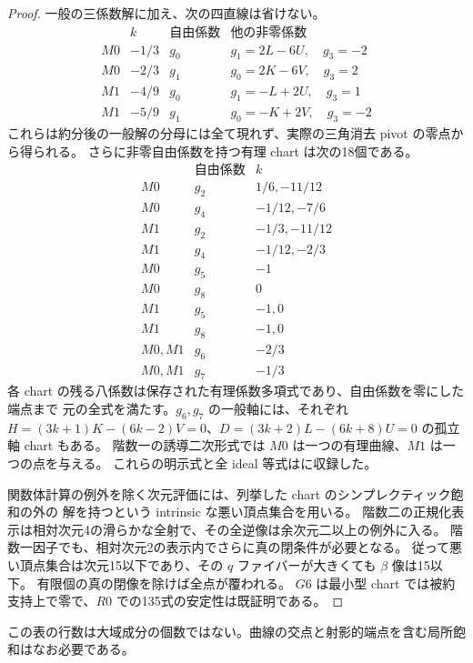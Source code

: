 \documentclass[11pt,a4paper]{ltjsarticle}
\theoremstyle{remark}
\begin{document}
\begin{proof}
一般の三係数解に加え、次の四直線は省けない。
\[
\begin{array}{c|c|c|l}
 &k&\text{自由係数}&\text{他の非零係数}\\\hline
 M0&-1/3&g_0&g_1=2L-6U,\quad g_3=-2\\
 M0&-2/3&g_1&g_0=2K-6V,\quad g_3=2\\
 M1&-4/9&g_0&g_1=-L+2U,\quad g_3=1\\
 M1&-5/9&g_1&g_0=-K+2V,\quad g_3=-2
\end{array}
\]
これらは約分後の一般解の分母には全て現れず、実際の三角消去 pivot の零点から得られる。
さらに非零自由係数を持つ有理 chart は次の18個である。
\[
\begin{array}{c|c|c}
&\text{自由係数}&k\\\hline
M0&g_2&1/6,-11/12\\ M0&g_4&-1/12,-7/6\\
M1&g_2&-1/3,-11/12\\ M1&g_4&-1/12,-2/3\\
M0&g_5&-1\\M0&g_8&0\\
M1&g_5&-1,0\\M1&g_8&-1,0\\
M0,M1&g_6&-2/3\\M0,M1&g_7&-1/3
\end{array}
\]
各 chart の残る八係数は保存された有理係数多項式であり、自由係数を零にした端点まで
元の全式を満たす。$g_6,g_7$ の一般軸には、それぞれ
$H=(3k+1)K-(6k-2)V=0$、$D=(3k+2)L-(6k+8)U=0$ の孤立軸 chart もある。
階数一の誘導二次形式では $M0$ は一つの有理曲線、$M1$ は一つの点を与える。
これらの明示式と全 ideal 等式は\cite{minimal-all-v35}に収録した。

関数体計算の例外を除く次元評価には、列挙した chart のシンプレクティック飽和の外の
解を持つという intrinsic な悪い頂点集合を用いる。
階数二の正規化表示は相対次元4の滑らかな全射で、その全逆像は余次元二以上の例外に入る。
階数一因子でも、相対次元2の表示内でさらに真の閉条件が必要となる。
従って悪い頂点集合は次元15以下であり、その $q$ ファイバーが大きくても $\beta$ 像は15以下。
有限個の真の閉像を除けば全点が覆われる。
$G6$ は最小型 chart では被約支持上で零で、$R0$ での135式の安定性は既証明である。
\end{proof}
この表の行数は大域成分の個数ではない。曲線の交点と射影的端点を含む局所飽和はなお必要である。
\end{document}

